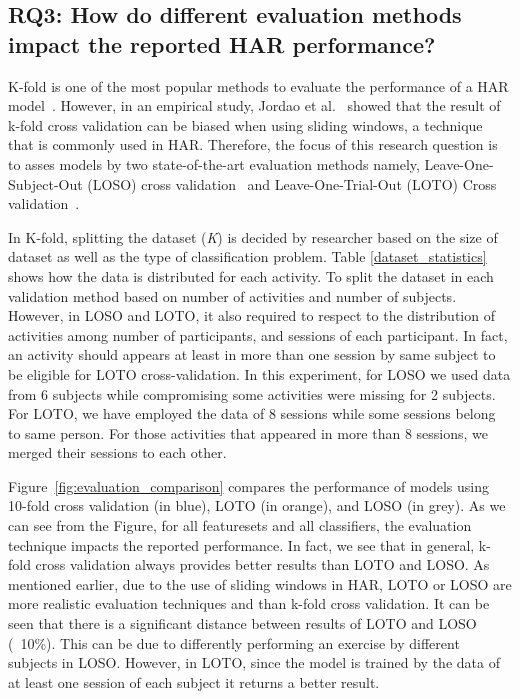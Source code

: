 \documentclass[journal,article,submit,moreauthors,pdftex]{Definitions/mdpi}
\begin{document}
\subsection{RQ3: How do different evaluation methods impact the reported HAR performance?}

K-fold is one of the most popular methods to evaluate the performance of a HAR model~\cite{wang2019survey}. However, in an empirical study, Jordao et al.~\cite{jordao2018human} showed that the result of k-fold cross validation can be biased when using sliding windows, a technique that is commonly used in HAR. Therefore, the focus of this research question is to asses models by two state-of-the-art evaluation methods namely, Leave-One-Subject-Out (LOSO) cross validation~\cite{liu2011multisensor} and Leave-One-Trial-Out (LOTO) Cross validation~\cite{sena2018multiscale,jordao2018human}. 

In K-fold, splitting the dataset (\textit{K}) is decided by researcher based on the size of dataset as well as the type of classification problem\cite{jordao2018human}. Table \ref{dataset_statistics} shows how the data is distributed for each activity. To split the dataset in each validation method based on number of activities and number of subjects.
However, in LOSO and LOTO, it also required to respect to the distribution of activities among number of participants, and sessions of each participant. In fact, an activity should appears at least in more than one session by same subject to be eligible for LOTO cross-validation. In this experiment, for LOSO we used data from 6 subjects while compromising some activities were missing for 2 subjects. For LOTO, we have employed the data of 8 sessions while some sessions belong to same person. For those activities that appeared in more than 8 sessions, we merged their sessions to each other. 

Figure~\ref{fig:evaluation_comparison} compares the performance of models using 10-fold cross validation (in blue), LOTO (in orange), and LOSO (in grey). As we can see from the Figure, for all featuresets and all classifiers, the evaluation technique impacts the reported performance. In fact, we see that in general, k-fold cross validation always provides better results than LOTO and LOSO. As mentioned earlier, due to the use of sliding windows in HAR, LOTO or LOSO are more realistic evaluation techniques and than k-fold cross validation. It can be seen that there is a significant distance between results of LOTO and LOSO (~10\%). This can be due to differently performing an exercise by different subjects in LOSO. However, in LOTO, since the model is trained by the data of at least one session of each subject it returns a better result. 
\end{document}
